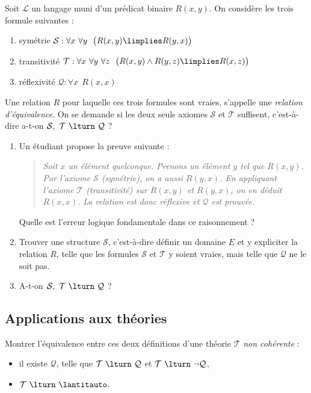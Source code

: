 \documentclass[11pt,class=report,crop=false]{standalone}
\begin{document}
\begin{exercicecours}
Soit $\mathcal{L}$ un langage muni d'un prédicat binaire $R(x,y)$.
On considère les trois formule suivantes :
\begin{enumerate}
	\item symétrie $\mathcal{S} : \forall x \ \forall y \ \ \big( R(x,y) \limplies R(y,x) \big)$
	
	\item transitivité $\mathcal{T} : \forall x \ \forall y \ \forall z \ \ \big( R(x,y) \land R(y,z) \limplies R(x,z) \big)$	
	
	\item réflexivité $\mathcal{Q} : \forall x \  \ R(x,x)$
\end{enumerate}
Une relation $R$ pour laquelle ces trois formules sont vraies, s'appelle une \emph{relation d'équivalence}. On se demande si les deux seuls axiomes $\mathcal{S}$ et $\mathcal{T}$ suffisent, c'est-à-dire a-t-on $\mathcal{S}, \ \mathcal{T} \ \lturn \ \mathcal{Q}$ ?

\begin{enumerate}
	\item Un étudiant propose la preuve suivante :
	\begin{quote}
	\emph{Soit $x$ un élément quelconque. Prenons un élément $y$ tel que $R(x,y)$. Par l'axiome $\mathcal{S}$ (symétrie), on a aussi $R(y,x)$. En appliquant l'axiome $\mathcal{T}$ (transitivité) sur $R(x,y)$ et $R(y,x)$, on en déduit $R(x,x)$. La relation est donc réflexive	et $\mathcal{Q}$ est prouvée.}
	\end{quote}
	
	Quelle est l'erreur logique fondamentale dans ce raisonnement ?
	
	\item Trouver une structure $\mathcal{S}$, c'est-à-dire définir un domaine $E$ et y expliciter la relation $R$, telle que les formules  $\mathcal{S}$ et $\mathcal{T}$ y soient vraies, mais telle que $\mathcal{Q}$ ne le soit pas.
	
	\item A-t-on $\mathcal{S}, \ \mathcal{T} \ \lturn \ \mathcal{Q}$ ?
\end{enumerate}
\end{exercicecours}	
	
\subsection*{Applications aux théories}

\begin{exercicecours}
	Montrer l'équivalence entre ces deux définitions d'une théorie $\mathcal{T}$ \emph{non cohérente} :
	\begin{itemize}
		\item[(i)] il existe $\mathcal{Q}$, telle que  $\mathcal{T} \ \lturn \ \mathcal{Q}$ et $\mathcal{T} \ \lturn \ \lnot \mathcal{Q}$,
		
		\item[(ii)] $\mathcal{T} \ \lturn \ \lantitauto$.
	\end{itemize}
\end{exercicecours}
\end{document}
